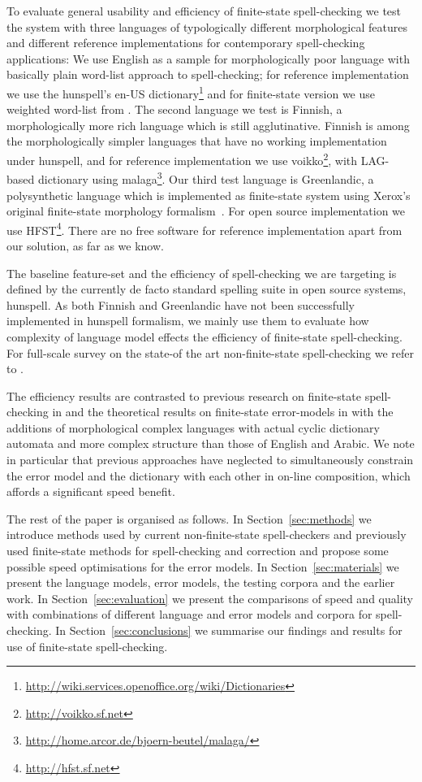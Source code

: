 \documentclass[11pt]{article}
\begin{document}
To evaluate general usability and efficiency of finite-state spell-checking we
test the system with three languages of typologically different morphological
features and different reference implementations for contemporary
spell-checking applications: We use English as a sample for morphologically
poor language with basically plain word-list approach to spell-checking; for
reference implementation we use the hunspell's en-US
dictionary\footnote{\url{http://wiki.services.openoffice.org/wiki/Dictionaries}}
and for finite-state version we use weighted word-list
from .  The second language we test is Finnish, a
morphologically more rich language which is still agglutinative. Finnish is
among the morphologically simpler languages that have no working implementation
under hunspell, and for reference implementation we use
voikko\footnote{\url{http://voikko.sf.net}}, with LAG-based dictionary using
malaga\footnote{\url{http://home.arcor.de/bjoern-beutel/malaga/}}. Our third
test language is Greenlandic, a polysynthetic language which is implemented as
finite-state system using Xerox's original finite-state morphology
formalism~\cite{beesley/2003}. For open source implementation we use
HFST\footnote{\url{http://hfst.sf.net}}. There are no free software for
reference implementation apart from our solution, as far as we know.

The baseline feature-set and the efficiency of spell-checking we are targeting
is defined by the currently de facto standard spelling suite in open source
systems, hunspell. As both Finnish and Greenlandic have not been successfully
implemented in hunspell formalism, we mainly use them to evaluate how complexity
of language model effects the efficiency of finite-state spell-checking. For
full-scale survey on the state-of the art non-finite-state spell-checking we
refer to .

The efficiency results are contrasted to previous research on finite-state
spell-checking in  and the theoretical results on
finite-state error-models in  with the additions of
morphological complex languages with actual cyclic dictionary automata and more
complex structure than those of English and Arabic. We note in particular that
previous approaches have neglected to simultaneously constrain the error
model and the dictionary with each other in on-line composition, which
affords a significant speed benefit.

The rest of the paper is organised as follows. In Section~\ref{sec:methods} we
introduce methods used by current non-finite-state spell-checkers and
previously used finite-state methods for spell-checking and correction and
propose some possible speed optimisations for the error models. In
Section~\ref{sec:materials} we present the language models, error models, the
testing corpora and the earlier work. In Section~\ref{sec:evaluation} we
present the comparisons of speed and quality with combinations of different
language and error models and corpora for spell-checking. In
Section~\ref{sec:conclusions} we summarise our findings and results for use
of finite-state spell-checking.
\end{document}
